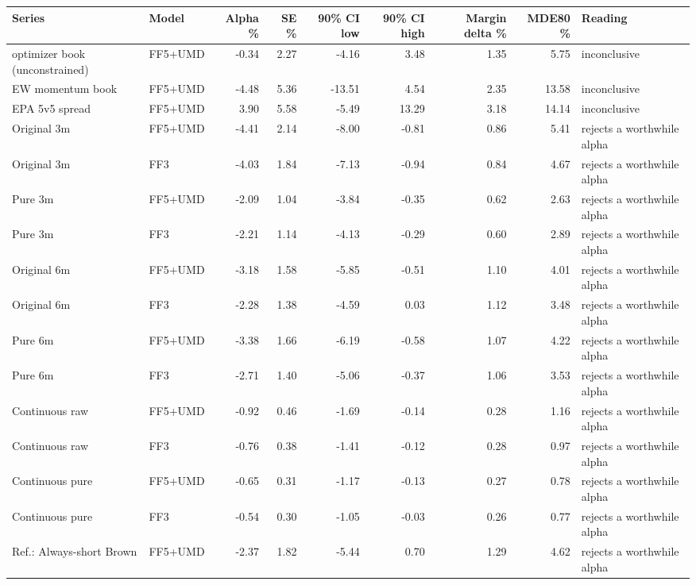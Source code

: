 \begin{adjustbox}{max width=\linewidth}
\begin{tabular}{llrrrrrrl}
\toprule
Series & Model & Alpha \% & SE \% & 90\% CI low & 90\% CI high & Margin delta \% & MDE80 \% & Reading \\
\midrule
optimizer book (unconstrained) & FF5+UMD & -0.34 & 2.27 & -4.16 & 3.48 & 1.35 & 5.75 & inconclusive \\
EW momentum book & FF5+UMD & -4.48 & 5.36 & -13.51 & 4.54 & 2.35 & 13.58 & inconclusive \\
EPA 5v5 spread & FF5+UMD & 3.90 & 5.58 & -5.49 & 13.29 & 3.18 & 14.14 & inconclusive \\
Original 3m & FF5+UMD & -4.41 & 2.14 & -8.00 & -0.81 & 0.86 & 5.41 & rejects a worthwhile alpha \\
Original 3m & FF3 & -4.03 & 1.84 & -7.13 & -0.94 & 0.84 & 4.67 & rejects a worthwhile alpha \\
Pure 3m & FF5+UMD & -2.09 & 1.04 & -3.84 & -0.35 & 0.62 & 2.63 & rejects a worthwhile alpha \\
Pure 3m & FF3 & -2.21 & 1.14 & -4.13 & -0.29 & 0.60 & 2.89 & rejects a worthwhile alpha \\
Original 6m & FF5+UMD & -3.18 & 1.58 & -5.85 & -0.51 & 1.10 & 4.01 & rejects a worthwhile alpha \\
Original 6m & FF3 & -2.28 & 1.38 & -4.59 & 0.03 & 1.12 & 3.48 & rejects a worthwhile alpha \\
Pure 6m & FF5+UMD & -3.38 & 1.66 & -6.19 & -0.58 & 1.07 & 4.22 & rejects a worthwhile alpha \\
Pure 6m & FF3 & -2.71 & 1.40 & -5.06 & -0.37 & 1.06 & 3.53 & rejects a worthwhile alpha \\
Continuous raw & FF5+UMD & -0.92 & 0.46 & -1.69 & -0.14 & 0.28 & 1.16 & rejects a worthwhile alpha \\
Continuous raw & FF3 & -0.76 & 0.38 & -1.41 & -0.12 & 0.28 & 0.97 & rejects a worthwhile alpha \\
Continuous pure & FF5+UMD & -0.65 & 0.31 & -1.17 & -0.13 & 0.27 & 0.78 & rejects a worthwhile alpha \\
Continuous pure & FF3 & -0.54 & 0.30 & -1.05 & -0.03 & 0.26 & 0.77 & rejects a worthwhile alpha \\
Ref.: Always-short Brown & FF5+UMD & -2.37 & 1.82 & -5.44 & 0.70 & 1.29 & 4.62 & rejects a worthwhile alpha \\
\bottomrule
\end{tabular}
\end{adjustbox}
\par{}
